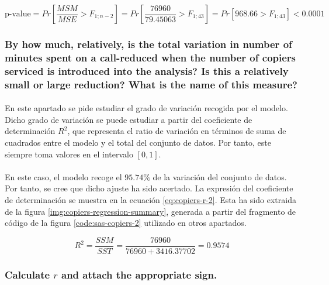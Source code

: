 \documentclass{article}
\begin{document}
        \begin{equation}
        \label{eq:copiers-f-test-p-value}
          \text{p-value} = Pr\left[\frac{MSM}{MSE} > F_{1;n-2}\right] =
          Pr\left[\frac{76960}{79.45063} > F_{1;43}\right] =
          Pr\left[968.66 > F_{1;43}\right] <
          0.0001
        \end{equation}

      \subsubsection{By how much, relatively, is the total variation in number of minutes spent on a call-reduced when the number of copiers serviced is introduced into the analysis? Is this a relatively small or large reduction? What is the name of this measure?}

        \paragraph{}
        En este apartado se pide estudiar el grado de variación recogida por el modelo. Dicho grado de variación se puede estudiar a partir del coeficiente de determinación $R^2$, que representa el ratio de variación en términos de suma de cuadrados entre el modelo y el total del conjunto de datos. Por tanto, este siempre toma valores en el intervalo $[0,1]$.

        \paragraph{}
        En este caso, el modelo recoge el $95.74\%$ de la variación del conjunto de datos. Por tanto, se cree que dicho ajuste ha sido acertado. La expresión del coeficiente de determinación se muestra en la ecuación \eqref{eq:copiers-r-2}. Esta ha sido extraida de la figura \ref{img:copiers-regression-summary}, generada a partir del fragmento de código de la figura \ref{code:sas-copiers-2} utilizado en otros apartados.

        \begin{equation}
        \label{eq:copiers-r-2}
          R^2 = \frac{SSM}{SST} = \frac{76960}{76960 + 3416.37702} = 0.9574
        \end{equation}

      \subsubsection{Calculate $r$ and attach the appropriate sign.}
\end{document}
